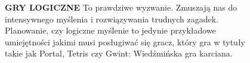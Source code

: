 \documentclass{beamer}
\begin{document}
\begin{frame} %
\begin{columns}
\begin{column}{0.5\textwidth}
        \normalsize \textbf {GRY LOGICZNE}
\newline
\small To prawdziwe wyzwanie. Zmuszają nas do intensywnego myślenia i rozwiązywania trudnych zagadek. Planowanie, czy logiczne myślenie to jedynie przykładowe umiejętności jakimi musi posługiwać się gracz, który gra w tytuły takie jak Portal, Tetris czy Gwint: Wiedźmińska gra karciana.

\end{column}
\begin{column}{0.5\textwidth}
    \begin{figure}
    \centering
        \includegraphics[width=4.5cm,height=6cm]{Portal.jpg}
\end{figure}
\end{column}
\end{columns}
\end{frame}
\end{document}
